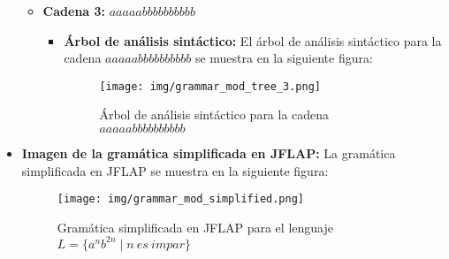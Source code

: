 \documentclass[11pt]{report}
\begin{document}
\begin{itemize}
\begin{itemize}
    \newpage
    
    \item \textbf{Cadena 3:} $aaaaabbbbbbbbbb$
    \begin{itemize}
      \item \textbf{Árbol de análisis sintáctico:} El árbol de análisis sintáctico para la cadena $aaaaabbbbbbbbbb$ se muestra en la siguiente figura:
      \begin{figure}[H]
        \centering
        \texttt{[image: img/grammar\_mod\_tree\_3.png]}
        \caption{Árbol de análisis sintáctico para la cadena $aaaaabbbbbbbbbb$}
        \label{fig:arbol12_mod}
      \end{figure}
    \end{itemize}
  \end{itemize}

    \newpage
  
  \item \textbf{Imagen de la gramática simplificada en JFLAP:} La gramática simplificada en JFLAP se muestra en la siguiente figura:
  \begin{figure}[H]
    \centering
      \texttt{[image: img/grammar\_mod\_simplified.png]}
    \caption{Gramática simplificada en JFLAP para el lenguaje $L = \{a^n b^{2n} \mid n \ es \ impar\}$}
  \end{figure}
\end{itemize}
\end{document}
